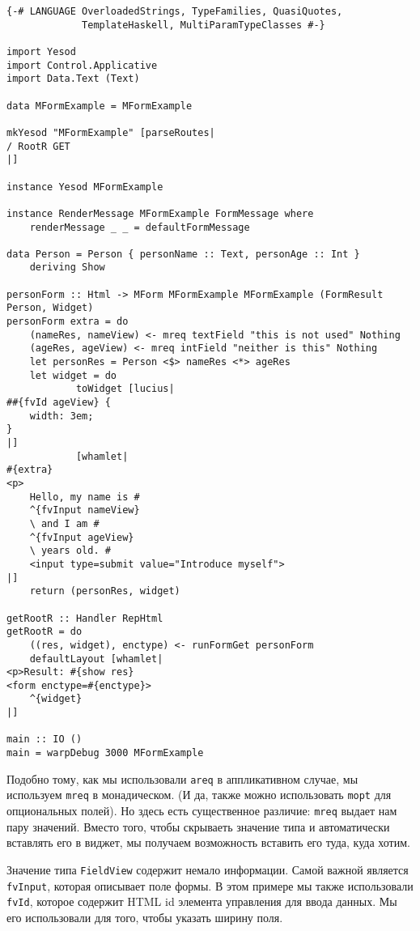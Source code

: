 \begin{lstlisting}
{-# LANGUAGE OverloadedStrings, TypeFamilies, QuasiQuotes,
             TemplateHaskell, MultiParamTypeClasses #-}

import Yesod
import Control.Applicative
import Data.Text (Text)

data MFormExample = MFormExample

mkYesod "MFormExample" [parseRoutes|
/ RootR GET
|]

instance Yesod MFormExample

instance RenderMessage MFormExample FormMessage where
    renderMessage _ _ = defaultFormMessage

data Person = Person { personName :: Text, personAge :: Int }
    deriving Show

personForm :: Html -> MForm MFormExample MFormExample (FormResult Person, Widget)
personForm extra = do
    (nameRes, nameView) <- mreq textField "this is not used" Nothing
    (ageRes, ageView) <- mreq intField "neither is this" Nothing
    let personRes = Person <$> nameRes <*> ageRes
    let widget = do
            toWidget [lucius|
##{fvId ageView} {
    width: 3em;
}
|]
            [whamlet|
#{extra}
<p>
    Hello, my name is #
    ^{fvInput nameView}
    \ and I am #
    ^{fvInput ageView}
    \ years old. #
    <input type=submit value="Introduce myself">
|]
    return (personRes, widget)

getRootR :: Handler RepHtml
getRootR = do
    ((res, widget), enctype) <- runFormGet personForm
    defaultLayout [whamlet|
<p>Result: #{show res}
<form enctype=#{enctype}>
    ^{widget}
|]

main :: IO ()
main = warpDebug 3000 MFormExample
\end{lstlisting}
Подобно тому, как мы использовали \lstinline'areq' в аппликативном случае, мы используем 
\lstinline'mreq' в монадическом. 
(И да, также можно использовать \lstinline'mopt' для опциональных полей).
Но здесь есть существенное различие: \lstinline'mreq' выдает нам пару значений. 
Вместо того, чтобы скрываеть значение типа 
и автоматически вставлять его в виджет, мы получаем возможность вставить его 
туда, куда хотим.

Значение типа \lstinline'FieldView' содержит немало информации. Самой важной является 
\lstinline'fvInput', которая описывает поле формы. В этом примере мы также использовали
\lstinline'fvId', которое содержит HTML id элемента управления для ввода данных. Мы
его использовали для того, чтобы указать ширину поля.

